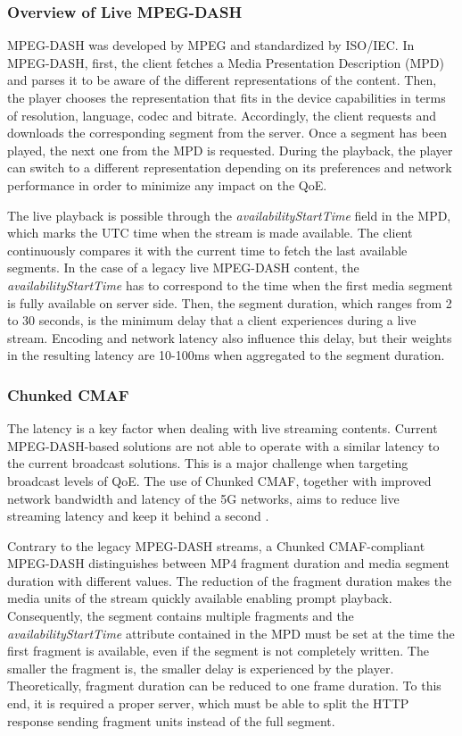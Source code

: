 \subsubsection{Overview of Live MPEG-DASH}
\label{sec:BMSB2019dash}
MPEG-DASH was developed by MPEG and standardized by ISO/IEC. In MPEG-DASH, first, the client fetches a Media Presentation Description (MPD) and parses it to be aware of the different representations of the content. Then, the player chooses the representation that fits in the device capabilities in terms of resolution, language, codec and bitrate. Accordingly, the client requests and downloads the corresponding segment from the server. Once a segment has been played, the next one from the MPD is requested. During the playback, the player can switch to a different representation depending on its preferences and network performance in order to minimize any impact on the QoE.

The live playback is possible through the \textit{availabilityStartTime} field in the MPD, which marks the UTC time when the stream is made available. The client continuously compares it with the current time to fetch the last available segments. In the case of a legacy live MPEG-DASH content, the \textit{availabilityStartTime} has to correspond to the time when the first media segment is fully available on server side. Then, the segment duration, which ranges from 2 to 30 seconds, is the minimum delay that a client experiences during a live stream. Encoding and network latency also influence this delay, but their weights in the resulting latency are 10-100ms when aggregated to the segment duration.

\subsubsection{Chunked CMAF}
\label{sec:BMSB2019cmaf}
The latency is a key factor when dealing with live streaming contents. Current MPEG-DASH-based solutions are not able to operate with a similar latency to the current broadcast solutions. This is a major challenge when targeting broadcast levels of QoE. The use of Chunked CMAF, together with improved network bandwidth and latency of the 5G networks, aims to reduce live streaming latency and keep it behind a second \cite{bouzakaria2014overhead}.

Contrary to the legacy MPEG-DASH streams, a Chunked CMAF-compliant MPEG-DASH distinguishes between MP4 fragment duration and media segment duration with different values. The reduction of the fragment duration makes the media units of the stream quickly available enabling prompt playback. Consequently, the segment contains multiple fragments and the \textit{availabilityStartTime} attribute contained in the MPD must be set at the time the first fragment is available, even if the segment is not completely written. The smaller the fragment is, the smaller delay is experienced by the player. Theoretically, fragment duration can be reduced to one frame duration. To this end, it is required a proper server, which must be able to split the HTTP response sending fragment units instead of the full segment.

